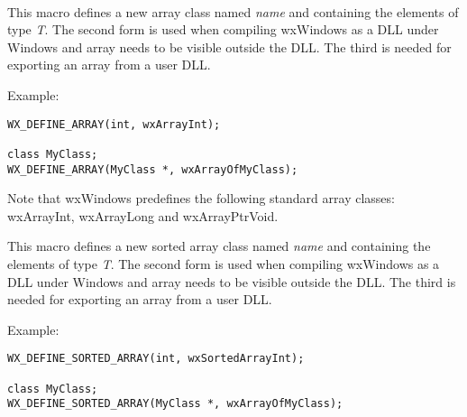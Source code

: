 
\\


\label{wxdefinearray}




This macro defines a new array class named {\it name} and containing the
elements of type {\it T}. The second form is used when compiling wxWindows as
a DLL under Windows and array needs to be visible outside the DLL.  The third is
needed for exporting an array from a user DLL.

Example:

\begin{verbatim}
WX_DEFINE_ARRAY(int, wxArrayInt);

class MyClass;
WX_DEFINE_ARRAY(MyClass *, wxArrayOfMyClass);
\end{verbatim}

Note that wxWindows predefines the following standard array classes: wxArrayInt,
wxArrayLong and wxArrayPtrVoid.

\label{wxdefinesortedarray}




This macro defines a new sorted array class named {\it name} and containing
the elements of type {\it T}. The second form is used when compiling wxWindows as
a DLL under Windows and array needs to be visible outside the DLL.  The third is
needed for exporting an array from a user DLL.

Example:

\begin{verbatim}
WX_DEFINE_SORTED_ARRAY(int, wxSortedArrayInt);

class MyClass;
WX_DEFINE_SORTED_ARRAY(MyClass *, wxArrayOfMyClass);
\end{verbatim}

